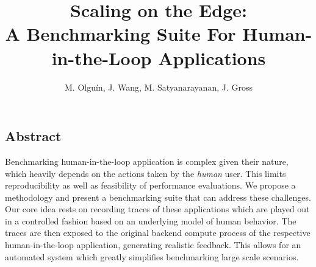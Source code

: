 \documentclass[portrait, a1]{KTHEEposter}
\begin{document}
    
    \title{\LARGE\bfseries Scaling on the Edge:\\A Benchmarking Suite For Human-in-the-Loop Applications}
    
    \author{\Large M. Olguín, J. Wang, M. Satyanarayanan, J. Gross}
    \maketitle
    
    \begin{pcolumns}[3]
        \begin{pcolumn}[2]
            \begin{pframe}[.67]
                \section{Abstract}
                Benchmarking human-in-the-loop application is complex given their nature, which heavily depends on the actions taken by the \emph{human} user.
                This limits reproducibility as well as feasibility of performance evaluations.
                We propose a methodology and present a benchmarking suite that can address these challenges.
                Our core idea rests on recording traces of these applications which are played out in a controlled fashion based on an underlying model of human behavior.
                The traces are then exposed to the original backend compute process of the respective human-in-the-loop application, generating realistic feedback.
                This allows for an automated system which greatly simplifies benchmarking large scale scenarios.
            \end{pframe}
            \begin{pframe}[1.33]

\end{pframe}
\end{pcolumn}
\end{pcolumns}
\end{document}
